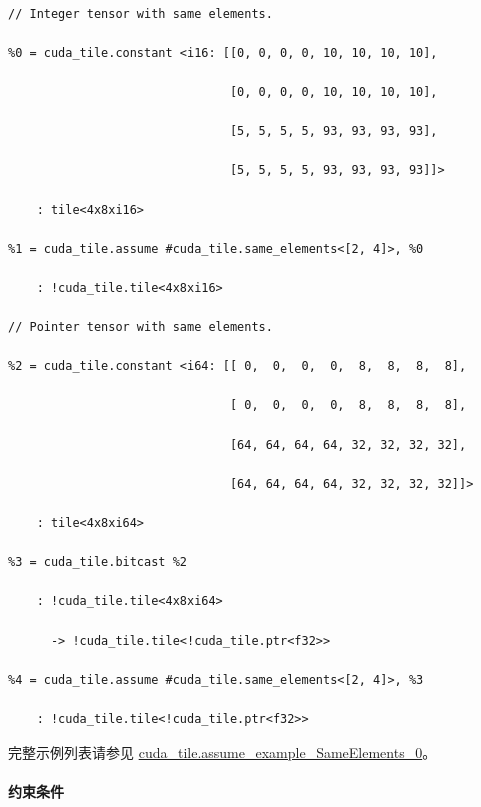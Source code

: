 \documentclass{article}
\begin{document}
\begin{lstlisting}

// Integer tensor with same elements.

%0 = cuda_tile.constant <i16: [[0, 0, 0, 0, 10, 10, 10, 10],

                               [0, 0, 0, 0, 10, 10, 10, 10],

                               [5, 5, 5, 5, 93, 93, 93, 93],

                               [5, 5, 5, 5, 93, 93, 93, 93]]>

    : tile<4x8xi16>

%1 = cuda_tile.assume #cuda_tile.same_elements<[2, 4]>, %0

    : !cuda_tile.tile<4x8xi16>

// Pointer tensor with same elements.

%2 = cuda_tile.constant <i64: [[ 0,  0,  0,  0,  8,  8,  8,  8],

                               [ 0,  0,  0,  0,  8,  8,  8,  8],

                               [64, 64, 64, 64, 32, 32, 32, 32],

                               [64, 64, 64, 64, 32, 32, 32, 32]]>

    : tile<4x8xi64>

%3 = cuda_tile.bitcast %2

    : !cuda_tile.tile<4x8xi64>

      -> !cuda_tile.tile<!cuda_tile.ptr<f32>>

%4 = cuda_tile.assume #cuda_tile.same_elements<[2, 4]>, %3

    : !cuda_tile.tile<!cuda_tile.ptr<f32>>

\end{lstlisting}



完整示例列表请参见 \href{https://docs.nvidia.com/cuda/tile-ir/latest/sections/appendix.html#example-cuda-tile-assume-example-sameelements-0}{cuda\_tile.assume\_example\_SameElements\_0}。





\paragraph{约束条件}
\end{document}

